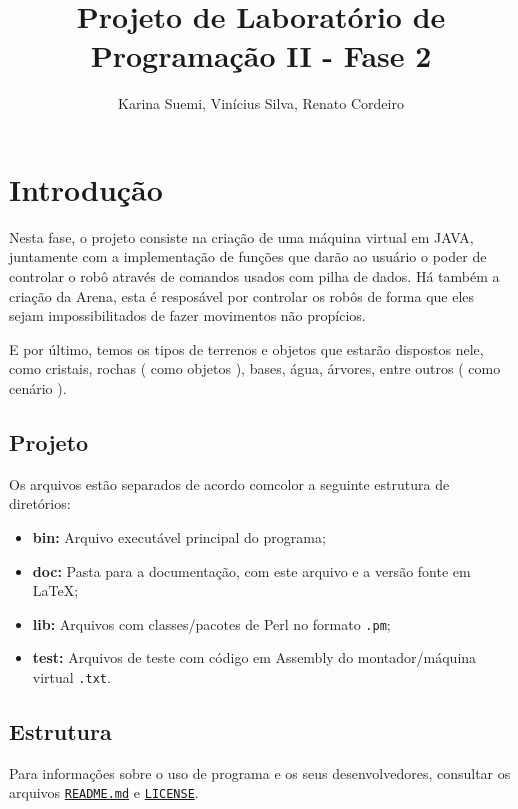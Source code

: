 \documentclass[a4paper]{article}
\title  {Projeto de Laboratório de Programação II - Fase 2}
\author {Karina Suemi, Vinícius Silva, Renato Cordeiro}
\date   {}
\begin{document}
\maketitle

\section{Introdução} \label{sec:introdução}

    Nesta fase, o projeto consiste na criação de uma máquina
    virtual em JAVA, juntamente com a implementação de funções
    que darão ao usuário o poder de controlar o robô através 
    de comandos usados com pilha de dados.
    Há também a criação da Arena, esta é resposável por controlar
    os robôs de forma que eles sejam impossibilitados de fazer
    movimentos não propícios. 
    
    E por último, temos os tipos de terrenos e objetos que estarão
    dispostos nele, como cristais, rochas ( como objetos ), bases, 
    água, árvores, entre outros ( como cenário ). 
    
    
    \subsection{Projeto}
    
    Os arquivos estão separados de acordo comcolor a seguinte estrutura de
    diretórios:
    \begin{itemize}
        \item \textbf{bin:}  Arquivo executável principal do programa;
        \item \textbf{doc:}  Pasta para a documentação, com este arquivo 
                             e a versão fonte em \LaTeX;
        \item \textbf{lib:}  Arquivos com classes/pacotes de Perl 
                             no formato \texttt{.pm};
        \item \textbf{test:} Arquivos de teste com código em Assembly
                             do montador/máquina virtual \texttt{.txt}.
    \end{itemize}
    
    \subsection{Estrutura}
      
        Para informações sobre o uso de programa e os seus 
        desenvolvedores, consultar os arquivos \href{run:../README.md}
        {\texttt{README.md}} e \href{run:../LICENSE}{\texttt{LICENSE}}.
        
\end{document}
